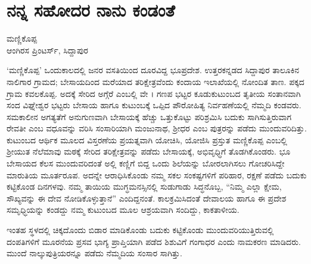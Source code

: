 {\fontsize{14}{16}\selectfont
\chapter{ನನ್ನ  ಸಹೋದರ ನಾನು ಕಂಡಂತೆ}

\begin{center}
\smallskip

ಮಣ್ಣಿಕೊಪ್ಪ\\
ಆಂಗಿರಸ ಪ್ರಿಂಟರ್ಸ್, ಸಿದ್ದಾಪುರ
\addrule
\end{center}

‘ಮಣ್ಣಿಕೊಪ್ಪ’  ಒಂದುಕಾಲದಲ್ಲಿ ಜನರ ವಸತಿಯಿಂದ ದೂರವಿದ್ದ ಭೂಪ್ರದೇಶ. ಉತ್ತರಕನ್ನಡದ ಸಿದ್ದಾಪುರ ತಾಲೂಕಿನ  ನಾಲಿಗಾರ ಗ್ರಾಮದ; ಬೇಸಾಯದಿಂದ ಮರೆಯಾದ ತರಿಕ್ಷೇತ್ರವೆಂದು ಕಂದಾಯ ಇಲಾಖೆಯಲ್ಲಿ ನೋಂದಿತ ತಾಣ.  ಪಕ್ಕದ ಗ್ರಾಮ ಕವಲಕೊಪ್ಪ. ಅದಕ್ಕೆ ಸೇರಿದ ಅಗ್ಗೆರೆ ಎಂಬಲ್ಲಿ ವೇ । ಗಣಪ ಭಟ್ಟರ ಕೂಡುಕುಟುಂಬದ ತೃತೀಯ ಸಂತಾನವಾಗಿ ಸಂದ ವಿಘ್ನೇಶ್ವರ ಭಟ್ಟರು ಬೇಸಾಯ ಹಾಗೂ ಕುಟುಂಬಕ್ಕೆ ಒಪ್ಪಿದ ಪೌರೋಹಿತ್ಯ ನಿರ್ವಹಣೆಯಲ್ಲಿ ನೆಮ್ಮದಿ ಕಂಡವರು.  ಸಮಕಾಲೀನ \hbox{ಅಗತ್ಯತೆಗೆ}  ಅನುಗುಣವಾಗಿ ಬೇಸಾಯಕ್ಕೆ ಹೆಚ್ಚು ಒತ್ತುಕೊಟ್ಟು ಪರಿಶ್ರಮಿಸಿ ಬದುಕು ಸಾಗಿಸುತ್ತಿರುವಾಗ ರೇವತೀ ಎಂಬ ವಧೂವನ್ನು ವರಿಸಿ ಸಂಸಾರಿಯಾಗಿ ಮಂಜುನಾಥ, ಶ್ರೀಧರ ಎಂಬ ಪುತ್ರರನ್ನು  ಪಡೆದು  ಮುಂದುವರಿದಿತ್ತು.  ಕುಟುಂಬದ ಆರ್ಥಿಕ ಮೂಲದ ವಿಸ್ತರಣೆಯ  ಪ್ರಯತ್ನವಾಗಿ  ಯೋಚಿಸಿ, ಯೋಜಿಸಿ  ಪ್ರಸ್ತುತ ಮಣ್ಣಿಕೊಪ್ಪ ಎಂಬಲ್ಲಿ ಶ್ರೀಯುತ ನೆಲೆಮಾವು  ಮಠಕ್ಕೆ ಸೇರಿದ ತರಿಕ್ಷೇತ್ರವನ್ನು  ಪಡೆದು ಬೇಸಾಯಕ್ಕೆ,  ಅಭಿವೃಧ್ಧಿಗೆ \hbox{ತೊಡಗಿ}ಕೊಂಡರು. ಭೂ ಬೇಸಾಯದ ಕೆಲಸ ಮುಂದುವರಿದಂತೆ ಅಲ್ಲಿ ಕಣ್ಣಿಗೆ ಬಿದ್ದ ಒಂದು  ಶಿಲೆಯನ್ನು ಬೋರಲಾಗಿಸಲು ಗೋಚರಿಸಿದ್ದೇ  ಮಾರುತಿಯ  ಮೂರ್ತರೂಪ.  ಅದನ್ನೇ ಆರಾಧಿಸಿಕೊಂಡು  ನಮ್ಮ ಸಕಲ ಸಂಕಷ್ಟಗಳಿಗೆ ಪರಿಹಾರ, ರಕ್ಷಣೆ ಪಡೆದು ಬದುಕು ಕಟ್ಟಿಕೊಂಡ ದಿನಗಳವು. ನಮ್ಮ ತಾಯಿಯ ಮುಗ್ಧಮನಸ್ಸಿನಲ್ಲಿ ಸುಡುಗಾಡು \hbox{ಸಿದ್ಧನೊಬ್ಬ,} “ನಿಮ್ಮ ಎಲ್ಲಾ ಕ್ಷೇಮ, ಸೌಖ್ಯವನ್ನು ಈ ದೇವ ನೋಡಿಕೊಳ್ಳುತ್ತಾನೆ” ಎಂದಿದ್ದನಂತೆ.  ಕಾಲಕ್ರಮಿಸಿದಂತೆ  ದೇವಾಲಯ ಹಾಗೂ  ಈ ಪ್ರದೇಶ ಸಮೃಧ್ಧಿಯನ್ನು ಕಂಡದ್ದು ನಮ್ಮ ಕುಟುಂಬದ ಮೂಲ ಆಶ್ರಯವಾಗಿ ಸಂದಿದ್ದು, ಕಾಕತಾಳೀಯ. 

ಇಂತಹ ಸ್ಥಳದಲ್ಲಿ ಚಿಕ್ಕದೊಂದು ಬಿಡಾರ ಮಾಡಿಕೊಂಡು ಬದುಕು ಕಟ್ಟಿಕೊಂಡು ಮುಂದುವರಿಯುತ್ತಿರುವಲ್ಲಿ  ದಂಪತಿಗಳಿಗೆ ಮೂರನೆಯ ಪ್ರಸವ ಭಾಗ್ಯ ಪ್ರಾಪ್ತಿಯಾಗಿ ಪಡೆದ ಶಿಶುವಿಗೆ  ಗಂಗಾಧರ ಎಂದು ನಾಮಕರಣ ಮಾಡಿದರು. ಮುಂದೆ ನಾಲ್ಕು\break ಪುತ್ರಿಯರನ್ನೂ  ಪಡೆದು ನೆಮ್ಮದಿಯ ಸಂಸಾರ ಸಾಗಿತ್ತು.	
	
}
